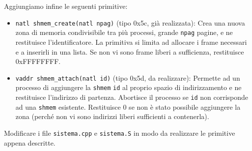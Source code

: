 Aggiungiamo infine le seguenti primitive:
\begin{itemize}
   \item \verb|natl shmem_create(natl npag)| (tipo 0x5c, gi\`a realizzata):
   	Crea una nuova zona di memoria condivisibile tra pi\`u processi, grande \verb|npag| pagine,
	e ne restituisce l'identificatore.
	La primitiva si limita ad allocare i frame necessari e a inserirli in una lista.
	Se non vi sono frame liberi a sufficienza, restituisce 0xFFFFFFFF.
   \item \verb|vaddr shmem_attach(natl id)| (tipo 0x5d, da realizzare):
   	Permette ad un processo di aggiungere la \verb|shmem| \verb|id| al proprio spazio di indirizzamento
	e ne restituisce l'indirizzo di partenza.
	Abortisce il processo se \verb|id| non corrisponde ad una \verb|shmem| esistente.
	Restituisce 0 se non \`e stato possibile aggiungere la zona (perch\'e non vi sono
	indirizzi liberi sufficienti a contenerla).
\end{itemize}

Modificare i file \verb|sistema.cpp| e \verb|sistema.S| in modo da realizzare le primitive appena descritte.

